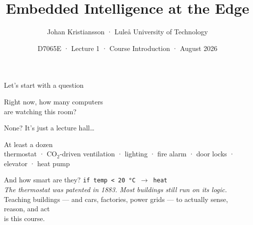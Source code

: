 \documentclass[aspectratio=169]{beamer}
\title{Embedded Intelligence at the Edge}
\date{D7065E \;·\; Lecture 1 \;·\; Course Introduction \;·\; 31 August 2026}
\author{Johan Kristiansson \;·\; Lule\aa{} University of Technology}
\newcommand{\hilite}[1]{\textcolor{accentColor}{#1}}
\newcommand{\subtle}[1]{\textcolor{subtleColor}{#1}}
\begin{document}
\begin{frame}
	\titlepage
\end{frame}

\begin{frame}{Let's start with a question}
	\begin{center}
		{\LARGE Right now, how many computers\\[2pt] are watching \hilite{this room}?}

		\vspace{0.7em}
		\pause
		{\Large \subtle{None? It's just a lecture hall\ldots}}

		\vspace{0.7em}
		\pause
		{\Large At least a \hilite{dozen}}\\[1pt]
		{\small thermostat \;·\; CO$_2$-driven ventilation \;·\; lighting \;·\; fire alarm \;·\; door locks \;·\; elevator \;·\; heat pump}

		\vspace{0.7em}
		\pause
		{\Large And how smart are they? \quad \hilite{\texttt{if temp < 20 °C $\rightarrow$ heat}}}\\[4pt]
		{\small \textit{The thermostat was patented in 1883. Most buildings still run on its logic.}}\\[5pt]
		Teaching buildings — and cars, factories, power grids — to actually \hilite{sense, reason, and act}\\
		is this course.
	\end{center}
\end{frame}
\end{document}
